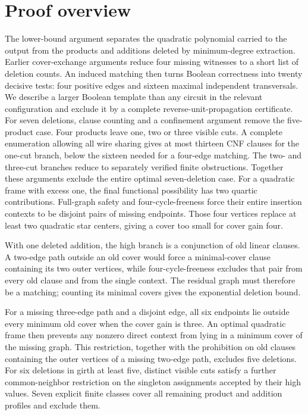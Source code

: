 \documentclass[11pt]{article}
\theoremstyle{definition}
\begin{document}
\section{Proof overview}
The lower-bound argument separates the quadratic polynomial carried to the output from the products and additions deleted by minimum-degree extraction. Earlier cover-exchange arguments reduce four missing witnesses to a short list of deletion counts. An induced matching then turns Boolean correctness into twenty decisive tests: four positive edges and sixteen maximal independent transversals. We describe a larger Boolean template than any circuit in the relevant configuration and exclude it by a complete reverse-unit-propagation certificate. For seven deletions, clause counting and a confinement argument remove the five-product case. Four products leave one, two or three visible cuts. A complete enumeration allowing all wire sharing gives at most thirteen CNF clauses for the one-cut branch, below the sixteen needed for a four-edge matching. The two- and three-cut branches reduce to separately verified finite obstructions. Together these arguments exclude the entire optimal seven-deletion case. For a quadratic frame with excess one, the final functional possibility has two quartic contributions. Full-graph safety and four-cycle-freeness force their entire insertion contexts to be disjoint pairs of missing endpoints. Those four vertices replace at least two quadratic star centers, giving a cover too small for cover gain four.

With one deleted addition, the high branch is a conjunction of old linear clauses. A two-edge path outside an old cover would force a minimal-cover clause containing its two outer vertices, while four-cycle-freeness excludes that pair from every old clause and from the single context. The residual graph must therefore be a matching; counting its minimal covers gives the exponential deletion bound.

For a missing three-edge path and a disjoint edge, all six endpoints lie outside every minimum old cover when the cover gain is three. An optimal quadratic frame then prevents any nonzero direct context from lying in a minimum cover of the missing graph. This restriction, together with the prohibition on old clauses containing the outer vertices of a missing two-edge path, excludes five deletions. For six deletions in girth at least five, distinct visible cuts satisfy a further common-neighbor restriction on the singleton assignments accepted by their high values. Seven explicit finite classes cover all remaining product and addition profiles and exclude them.
\end{document}
